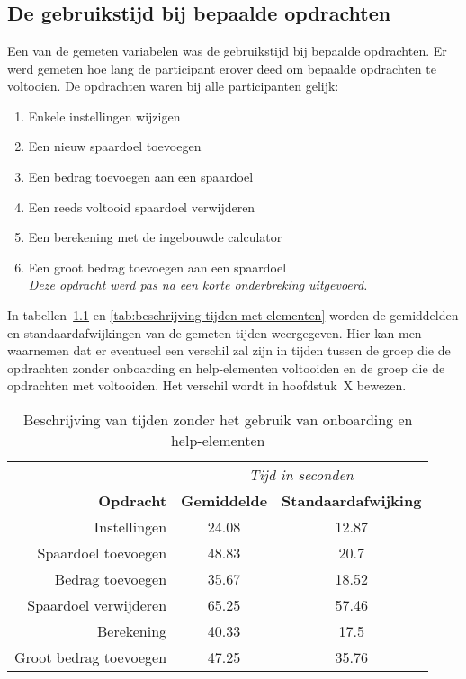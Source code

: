 \chapter{}
\label{ch:metingen}

\section{De gebruikstijd bij bepaalde opdrachten}
\label{sec:gebruikstijd}

Een van de gemeten variabelen was de gebruikstijd bij bepaalde opdrachten. Er werd gemeten hoe lang de participant erover deed om bepaalde opdrachten te voltooien. De opdrachten waren bij alle participanten gelijk:
\begin{enumerate}
    \item Enkele instellingen wijzigen
    \item Een nieuw spaardoel toevoegen
    \item Een bedrag toevoegen aan een spaardoel
    \item Een reeds voltooid spaardoel verwijderen
    \item Een berekening met de ingebouwde calculator
    \item Een groot bedrag toevoegen aan een spaardoel\\\textit{Deze opdracht werd pas na een korte onderbreking uitgevoerd.}
\end{enumerate}

In tabellen~\ref{tab:beschrijving-tijden-zonder-elementen} en \ref{tab:beschrijving-tijden-met-elementen} worden de gemiddelden en standaardafwijkingen van de gemeten tijden weergegeven. Hier kan men waarnemen dat er eventueel een verschil zal zijn in tijden tussen de groep die de opdrachten zonder onboarding en help-elementen voltooiden en de groep die de opdrachten met voltooiden. Het verschil wordt in hoofdstuk~X bewezen. %

\begin{table}[h]
    \centering
    \begin{tabular}{rcc}
        \multicolumn{1}{l}{} & \multicolumn{2}{c}{\textit{Tijd in seconden}} \\
        \multicolumn{1}{r|}{\textbf{Opdracht}} & \textbf{Gemiddelde} & \textbf{Standaardafwijking} \\ \hline
        \multicolumn{1}{r|}{Instellingen} & 24.08 & 12.87 \\
        \multicolumn{1}{r|}{Spaardoel toevoegen} & 48.83 & 20.7 \\
        \multicolumn{1}{r|}{Bedrag toevoegen} & 35.67 & 18.52 \\
        \multicolumn{1}{r|}{Spaardoel verwijderen} & 65.25 & 57.46 \\
        \multicolumn{1}{r|}{Berekening} & 40.33 & 17.5 \\
        \multicolumn{1}{r|}{Groot bedrag toevoegen} & 47.25 & 35.76
    \end{tabular}
    \caption{Beschrijving van tijden zonder het gebruik van onboarding en help-elementen}
    \label{tab:beschrijving-tijden-zonder-elementen}
\end{table}

